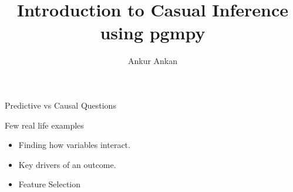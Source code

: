\documentclass{beamer}
\begin{document}
\title[]{Introduction to Casual Inference using pgmpy}
\author{Ankur Ankan}
\date{}

\maketitle

\begin{frame}{Predictive vs Causal Questions}
\end{frame}

\begin{frame}{Few real life examples}
	\begin{itemize}
		\item Finding how variables interact.
		\item Key drivers of an outcome.
		\item Feature Selection
	\end{itemize}
\end{frame}
\end{document}
